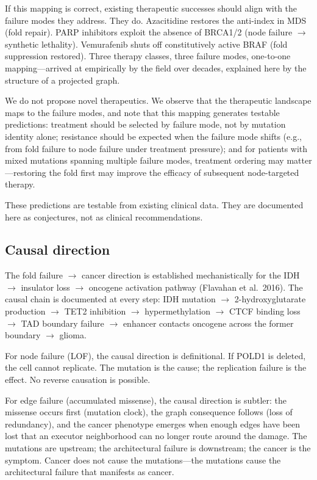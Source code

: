 \documentclass[11pt]{article}
\theoremstyle{definition}
\begin{document}
If this mapping is correct, existing therapeutic successes should align with the failure modes they address. They do. Azacitidine restores the anti-index in MDS (fold repair). PARP inhibitors exploit the absence of BRCA1/2 (node failure $\to$ synthetic lethality). Vemurafenib shuts off constitutively active BRAF (fold suppression restored). Three therapy classes, three failure modes, one-to-one mapping---arrived at empirically by the field over decades, explained here by the structure of a projected graph.

We do not propose novel therapeutics. We observe that the therapeutic landscape maps to the failure modes, and note that this mapping generates testable predictions: treatment should be selected by failure mode, not by mutation identity alone; resistance should be expected when the failure mode shifts (e.g., from fold failure to node failure under treatment pressure); and for patients with mixed mutations spanning multiple failure modes, treatment ordering may matter---restoring the fold first may improve the efficacy of subsequent node-targeted therapy.

These predictions are testable from existing clinical data. They are documented here as conjectures, not as clinical recommendations.

\subsection{Causal direction}

The fold failure $\to$ cancer direction is established mechanistically for the IDH $\to$ insulator loss $\to$ oncogene activation pathway (Flavahan et al.\ 2016). The causal chain is documented at every step: IDH mutation $\to$ 2-hydroxyglutarate production $\to$ TET2 inhibition $\to$ hypermethylation $\to$ CTCF binding loss $\to$ TAD boundary failure $\to$ enhancer contacts oncogene across the former boundary $\to$ glioma.

For node failure (LOF), the causal direction is definitional. If POLD1 is deleted, the cell cannot replicate. The mutation is the cause; the replication failure is the effect. No reverse causation is possible.

For edge failure (accumulated missense), the causal direction is subtler: the missense occurs first (mutation clock), the graph consequence follows (loss of redundancy), and the cancer phenotype emerges when enough edges have been lost that an executor neighborhood can no longer route around the damage. The mutations are upstream; the architectural failure is downstream; the cancer is the symptom. Cancer does not cause the mutations---the mutations cause the architectural failure that manifests as cancer.
\end{document}
